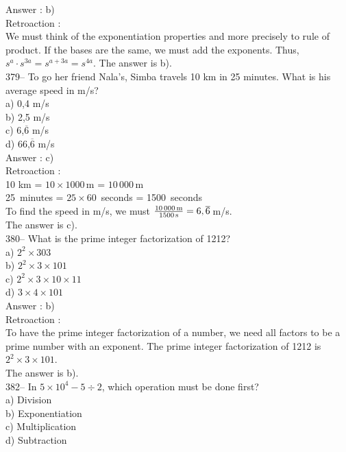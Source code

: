 ﻿\documentclass[letterpaper, 12pt]{article}
\begin{document}
Answer : b)\\

Retroaction : \\
We must think of the exponentiation properties and more precisely to rule of product. If the bases are the same, we must add the exponents. Thus, $s^{a}\cdot s^{3a}=s^{a+3a}=s^{4a}$. The answer is b).\\

379-- To go her friend Nala's, Simba travels 10 km in 25 minutes.
  What is his average speed in m/s?\\
a) 0,4 m/s\\
b) 2,5 m/s\\
c) 6,$\overline{6}$ m/s\\
d) 66,$\overline{6}$ m/s\\

Answer : c)\\

Retroaction : \\
10 km = $10\times1000$\,m = $10\,000$\,m\\
25~minutes = $25\times60$~seconds = 1500~seconds\\
To find the speed in m/s, we must
$\frac{10\,000\textrm{\,m}}{1500\textrm{\,s}}=6,\overline{6}$\,m/s.\\
The answer is c).\\

380-- What is the prime integer factorization of 1212?\\
a) $2^{2}\times303$\\
b) $2^{2}\times3\times101$\\
c) $2^{2}\times3\times10\times11$\\
d) $3\times4\times101$\\


Answer : b)\\

Retroaction : \\
To have the prime integer factorization of a number, we need all factors to be a prime number with an exponent. The prime integer factorization of 1212 is $2^{2}\times3\times101$.\\  The answer is b).\\


382-- In $5\times10^{4}-5\div2$, which operation must be done first?\\
a) Division\\
b) Exponentiation\\
c) Multiplication\\
d) Subtraction\\
\end{document}
